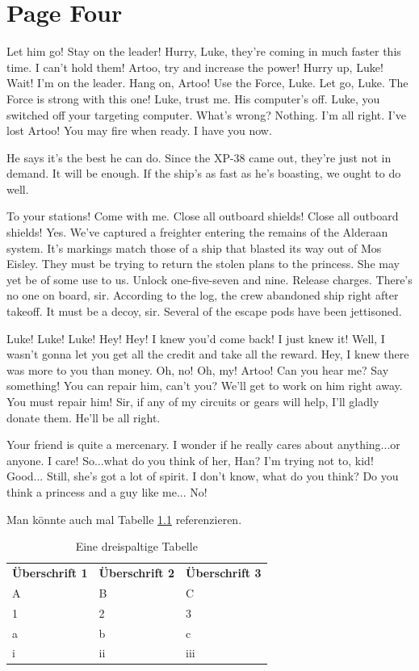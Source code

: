 \chapter{Page Four}\label{sec:page_four}

Let him go! Stay on the leader! Hurry, Luke, they're coming in much faster this time. I can't hold them! Artoo, try and increase the power! Hurry up, Luke! Wait! I'm on the leader. Hang on, Artoo! Use the Force, Luke. Let go, Luke. The Force is strong with this one! Luke, trust me. His computer's off. Luke, you switched off your targeting computer. What's wrong? Nothing. I'm all right. I've lost Artoo! You may fire when ready. I have you now.

He says it's the best he can do. Since the XP-38 came out, they're just not in demand. It will be enough. If the ship's as fast as he's boasting, we ought to do well.

To your stations! Come with me. Close all outboard shields! Close all outboard shields! Yes. We've captured a freighter entering the remains of the Alderaan system. It's markings match those of a ship that blasted its way out of Mos Eisley. They must be trying to return the stolen plans to the princess. She may yet be of some use to us. Unlock one-five-seven and nine. Release charges. There's no one on board, sir. According to the log, the crew abandoned ship right after takeoff. It must be a decoy, sir. Several of the escape pods have been jettisoned.

Luke! Luke! Luke! Hey! Hey! I knew you'd come back! I just knew it! Well, I wasn't gonna let you get all the credit and take all the reward. Hey, I knew there was more to you than money. Oh, no! Oh, my! Artoo! Can you hear me? Say something! You can repair him, can't you? We'll get to work on him right away. You must repair him! Sir, if any of my circuits or gears will help, I'll gladly donate them. He'll be all right.

Your friend is quite a mercenary. I wonder if he really cares about anything...or anyone. I care! So...what do you think of her, Han? I'm trying not to, kid! Good... Still, she's got a lot of spirit. I don't know, what do you think? Do you think a princess and a guy like me... No!

Man könnte auch mal Tabelle \ref{tab:threecols} referenzieren.

\begin{table}
	\centering
	\begin{tabular}{lll}
		\textbf{Überschrift 1} & \textbf{Überschrift 2} & \textbf{Überschrift 3} \\
		A & B & C \\
		1 & 2 & 3 \\
		a & b & c \\
		i & ii & iii \\
	\end{tabular}
	\caption{Eine dreispaltige Tabelle}
	\label{tab:threecols}
\end{table}


